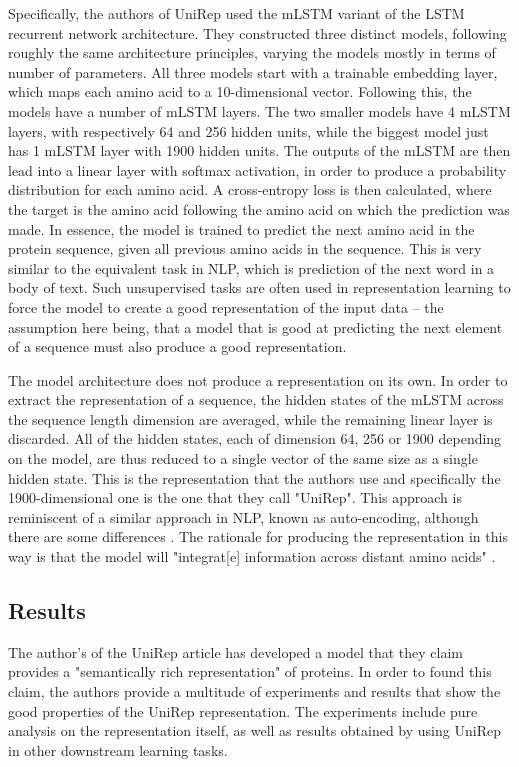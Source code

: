 \documentclass[a4paper,12pt]{article}
\begin{document}
Specifically, the authors of UniRep used the mLSTM variant of the LSTM recurrent network architecture. They constructed three distinct models, following roughly the same architecture principles, varying the models mostly in terms of number of parameters. All three models start with a trainable embedding layer, which maps each amino acid to a 10-dimensional vector. Following this, the models have a number of mLSTM layers. The two smaller models have 4 mLSTM layers, with respectively 64 and 256 hidden units, while the biggest model just has 1 mLSTM layer with 1900 hidden units. The outputs of the mLSTM are then lead into a linear layer with softmax activation, in order to produce a probability distribution for each amino acid. A cross-entropy loss is then calculated, where the target is the amino acid following the amino acid on which the prediction was made. In essence, the model is trained to predict the next amino acid in the protein sequence, given all previous amino acids in the sequence. This is very similar to the equivalent task in NLP, which is prediction of the next word in a body of text. Such unsupervised tasks are often used in representation learning to force the model to create a good representation of the input data -- the assumption here being, that a model that is good at predicting the next element of a sequence must also produce a good representation.

The model architecture does not produce a representation on its own. In order to extract the representation of a sequence, the hidden states of the mLSTM across the sequence length dimension are averaged, while the remaining linear layer is discarded. All of the hidden states, each of dimension 64, 256 or 1900 depending on the model, are thus reduced to a single vector of the same size as a single hidden state. This is the representation that the authors use and specifically the 1900-dimensional one is the one that they call "UniRep". This approach is reminiscent of a similar approach in NLP, known as auto-encoding, although there are some differences . The rationale for producing the representation in this way is that the model will "integrat[e] information across distant amino acids" \cite[p. 9]{alley2019unified}.

\subsection{Results}

The author's of the UniRep article has developed a model that they claim provides a "semantically rich representation" of proteins. In order to found this claim, the authors provide a multitude of experiments and results that show the good properties of the UniRep representation. The experiments include pure analysis on the representation itself, as well as results obtained by using UniRep in other downstream learning tasks.
\end{document}
